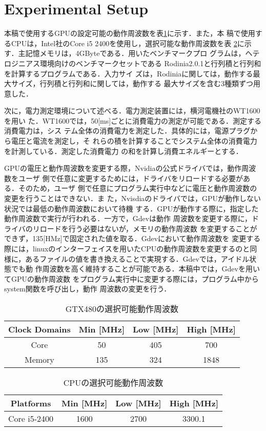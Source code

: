 \section{Experimental Setup}

本稿で使用するGPUの設定可能の動作周波数を表\ref{GPU-frequency}に示す．また，本
稿で使用するCPUは，Intel社のCore i5 2400を使用し，選択可能な動作周波数を表
\ref{CPU-frequency}に示す．主記憶メモリは，4GByteである．用いたベンチマークプロ
グラムは，ヘテロジニアス環境向けのベンチマークセットである
Rodinia2.0.1\cite{Che2010}と行列積と行列和を計算するプログラムである．入力サイ
ズは，Rodiniaに関しては，動作する最大サイズ，行列積と行列和に関しては，動作する
最大サイズを含む3種類ずつ用意した．

次に，電力測定環境について述べる．電力測定装置には，横河電機社のWT1600を用い
た．WT1600では，50[ms]ごとに消費電力の測定が可能である．測定する消費電力は，シス
テム全体の消費電力を測定した．具体的には，電源プラグから電圧と電流を測定し，そ
れらの積を計算することでシステム全体の消費電力を計測している．測定した消費電力
の和を計算し消費エネルギーとする．

GPUの電圧と動作周波数を変更する際，Nvidiaの公式ドライバでは，動作周波数をユーザ
側で任意に変更するためには，ドライバをリロードする必要がある．そのため，ユーザ
側で任意にプログラム実行中などに電圧と動作周波数の変更を行うことはできない．ま
た，Nvisdiaのドライバでは，GPUが動作しない状況では最低の動作周波数において待機
する．GPUが動作する際に，指定した動作周波数で実行が行われる．一方で，Gdevは動作
周波数を変更する際に，ドライバのリロードを行う必要はないが，メモリの動作周波数
を変更することができず，135[HMz]で固定された値を取る．Gdevにおいて動作周波数を
変更する際には，linuxのインターフェイスを用いたCPUの動作周波数を変更するのと同
様に，あるファイルの値を書き換えることで実現する．Gdevでは，アイドル状態でも動
作周波数を高く維持することが可能である．本稿中では，Gdevを用いてGPUの動作周波数
をプログラム実行中に変更する際には，プログラム中からsystem関数を呼び出し，動作
周波数の変更を行う．


\begin{table}[!t]
 \caption{GTX480の選択可能動作周波数}
 \vspace{-2.0mm}
 \label{GPU-frequency}
 \footnotesize
 \begin{center}
  \begin{tabular}{|c|c|c|c|}
   \hline
   Clock Domains &Min [MHz]&Low [MHz] & High [MHz]\\
   \hline\hline
    Core & 50 & 405 & 700\\
    \hline
    Memory & 135 & 324 & 1848\\
   \hline
  \end{tabular}
  \vspace{-5.0mm}
 \end{center}
\end{table}


\begin{table}[!t]
 \caption{CPUの選択可能動作周波数}
 \small
 \label{CPU-frequency}
 \begin{center}
  \begin{tabular}{|c|c|c|c|}
   \hline
   Platforms&Min [MHz]&Low [MHz]&High [MHz]\\
   \hline\hline
   Core i5-2400 &1600& 2700 & 3300.1\\
   \hline
  \end{tabular}
 \end{center}
 \end{table}
